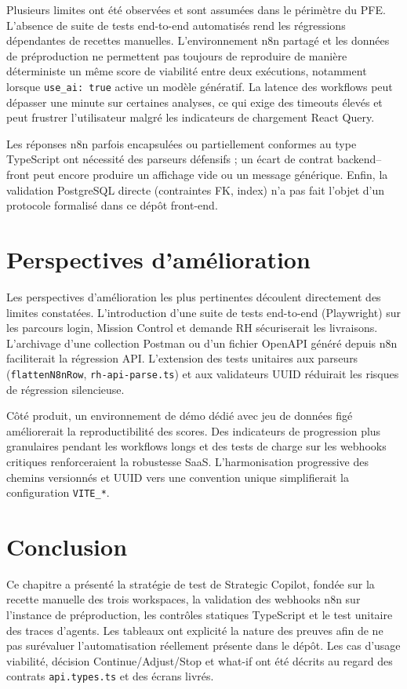 Plusieurs limites ont été observées et sont assumées dans le périmètre du PFE. L'absence de suite de tests end-to-end automatisés rend les régressions dépendantes de recettes manuelles. L'environnement n8n partagé et les données de préproduction ne permettent pas toujours de reproduire de manière déterministe un même score de viabilité entre deux exécutions, notamment lorsque \texttt{use\_ai: true} active un modèle génératif. La latence des workflows peut dépasser une minute sur certaines analyses, ce qui exige des timeouts élevés et peut frustrer l'utilisateur malgré les indicateurs de chargement React Query.

Les réponses n8n parfois encapsulées ou partiellement conformes au type TypeScript ont nécessité des parseurs défensifs ; un écart de contrat backend--front peut encore produire un affichage vide ou un message générique. Enfin, la validation PostgreSQL directe (contraintes FK, index) n'a pas fait l'objet d'un protocole formalisé dans ce dépôt front-end.

\section{Perspectives d'amélioration}

Les perspectives d'amélioration les plus pertinentes découlent directement des limites constatées. L'introduction d'une suite de tests end-to-end (Playwright) sur les parcours login, Mission Control et demande RH sécuriserait les livraisons. L'archivage d'une collection Postman ou d'un fichier OpenAPI généré depuis n8n faciliterait la régression API. L'extension des tests unitaires aux parseurs (\texttt{flattenN8nRow}, \texttt{rh-api-parse.ts}) et aux validateurs UUID réduirait les risques de régression silencieuse.

Côté produit, un environnement de démo dédié avec jeu de données figé améliorerait la reproductibilité des scores. Des indicateurs de progression plus granulaires pendant les workflows longs et des tests de charge sur les webhooks critiques renforceraient la robustesse SaaS. L'harmonisation progressive des chemins versionnés et UUID vers une convention unique simplifierait la configuration \texttt{VITE\_*}.

\section{Conclusion}

Ce chapitre a présenté la stratégie de test de Strategic Copilot, fondée sur la recette manuelle des trois workspaces, la validation des webhooks n8n sur l'instance de préproduction, les contrôles statiques TypeScript et le test unitaire des traces d'agents. Les tableaux ont explicité la nature des preuves afin de ne pas surévaluer l'automatisation réellement présente dans le dépôt. Les cas d'usage viabilité, décision Continue/Adjust/Stop et what-if ont été décrits au regard des contrats \texttt{api.types.ts} et des écrans livrés.

